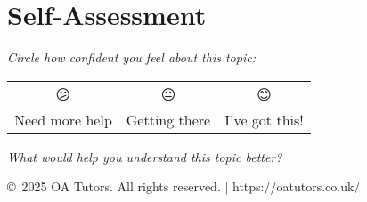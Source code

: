 \documentclass[a4paper,12pt]{article}
\begin{document}
\section{Self-Assessment}
\textit{Circle how confident you feel about this topic:}

\begin{center}
\begin{tabular}{|c|c|c|}
\hline
😕 & 😐 & 😊 \\
Need more help & Getting there & I've got this! \\
\hline
\end{tabular}
\end{center}

\textit{What would help you understand this topic better?}

\vspace{2cm}

\vfill
\begin{center}
\textcolor{oagray}{\small \copyright\ 2025 OA Tutors. All rights reserved. | https://oatutors.co.uk/}
\end{center}
\end{document}
